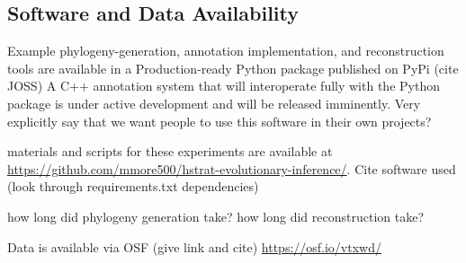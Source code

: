 \subsection{Software and Data Availability}

Example phylogeny-generation, annotation implementation, and reconstruction tools are available in a Production-ready Python package published on PyPi (cite JOSS) A C++ annotation system that will interoperate fully with the Python package is under active development and will be released imminently.
Very explicitly say that we want people to use this software in their own projects?

materials and scripts for these experiments are available at \url{https://github.com/mmore500/hstrat-evolutionary-inference/}. Cite software used (look through requirements.txt dependencies)

how long did phylogeny generation take? how long did reconstruction take?

Data is available via OSF (give link and cite) \url{https://osf.io/vtxwd/}